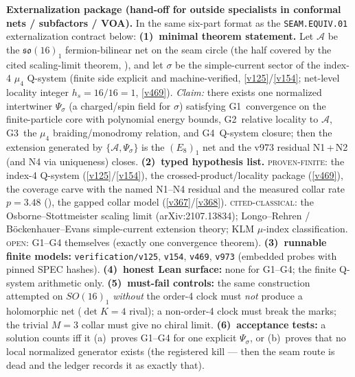 \documentclass[11pt,a4paper]{article}
\begin{document}
\par\smallskip\noindent\textbf{Externalization package (hand-off for outside specialists in
conformal nets / subfactors / VOA).}  In the same six-part format as the \texttt{SEAM.EQUIV.01}
externalization contract below:
\textbf{(1)~minimal theorem statement.}  Let $\mathcal A$ be the $\mathfrak{so}(16)_1$
fermion-bilinear net on the seam circle (the half covered by the cited scaling-limit theorem,
), and let $\sigma$ be the simple-current sector of the
index-4 $\mu_4$ Q-system (finite side explicit and machine-verified, \vref{v125}/\vref{v154};
net-level locality integer $h_s = 16/16 = 1$, \vref{v469}).  \emph{Claim:} there exists one
normalized intertwiner $\Psi_\sigma$ (a charged/spin field for $\sigma$) satisfying
G1~convergence on the finite-particle core with polynomial energy bounds, G2~relative locality
to $\mathcal A$, G3~the $\mu_4$ braiding/monodromy relation, and G4~Q-system closure; then the
extension generated by $\{\mathcal A, \Psi_\sigma\}$ is the $(E_8)_1$ net and the v973
residual N1\,+\,N2 (and N4 via uniqueness) closes.
\textbf{(2)~typed hypothesis list.}  \textsc{proven-finite}: the index-4 Q-system
(\vref{v125}/\vref{v154}), the crossed-product/locality package (\vref{v469}), the coverage
carve with the named N1--N4 residual and the measured collar rate $p = 3.48$
(), the gapped collar model (\vref{v367}/\vref{v368}).
\textsc{cited-classical}: the Osborne--Stottmeister scaling limit (arXiv:2107.13834);
Longo--Rehren / B\"ockenhauer--Evans simple-current extension theory; KLM $\mu$-index
classification.  \textsc{open}: G1--G4 themselves (exactly one convergence theorem).
\textbf{(3)~runnable finite models:} \texttt{verification/v125}, \texttt{v154}, \texttt{v469},
\texttt{v973} (embedded probes with pinned SPEC hashes).
\textbf{(4)~honest Lean surface:} none for G1--G4; the finite Q-system arithmetic only.
\textbf{(5)~must-fail controls:} the same construction attempted on $SO(16)_1$ \emph{without}
the order-4 clock must \emph{not} produce a holomorphic net ($\det K = 4$ rival); a
non-order-4 clock must break the marks; the trivial $M{=}3$ collar must give no chiral limit.
\textbf{(6)~acceptance tests:} a solution counts iff it (a)~proves G1--G4 for one explicit
$\Psi_\sigma$, or (b)~proves that no local normalized generator exists (the registered kill ---
then the seam route is dead and the ledger records it as exactly that).

\end{document}
